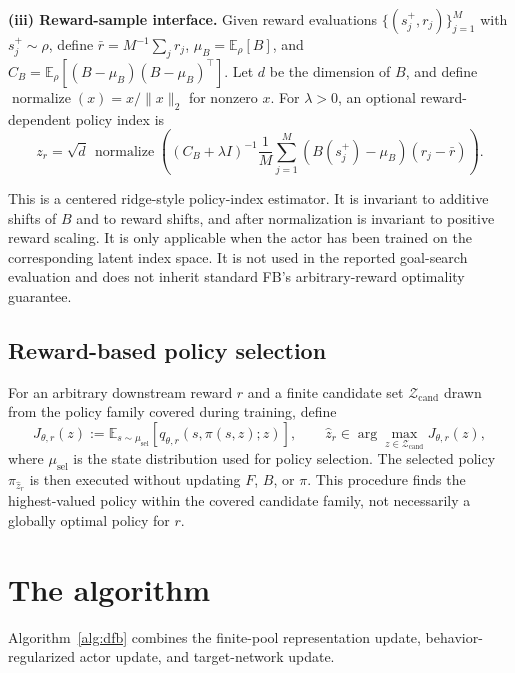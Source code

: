 \documentclass[11pt]{article}
\newcommand{\normalize}{\operatorname{normalize}}
\begin{document}
\textbf{(iii) Reward-sample interface.}
Given reward evaluations $\{(s_j^+,r_j)\}_{j=1}^{M}$ with $s_j^+\sim\rho$, define $\bar r=M^{-1}\sum_jr_j$, $\mu_B=\mathbb E_\rho[B]$, and $C_B=\mathbb E_\rho[(B-\mu_B)(B-\mu_B)^\top]$. Let $d$ be the dimension of $B$, and define $\normalize(x)=x/\lVert x\rVert_2$ for nonzero $x$. For $\lambda>0$, an optional reward-dependent policy index is
\begin{equation}
\boxed{
    z_r = \sqrt d\,\normalize\!\left((C_B+\lambda I)^{-1}\frac1M\sum_{j=1}^{M}(B(s_j^+)-\mu_B)(r_j-\bar r)\right).
}
\label{eq:centered-dual}
\end{equation}

This is a centered ridge-style policy-index estimator. It is invariant to additive shifts of $B$ and to reward shifts, and after normalization is invariant to positive reward scaling. It is only applicable when the actor has been trained on the corresponding latent index space. It is not used in the reported goal-search evaluation and does not inherit standard FB's arbitrary-reward optimality guarantee.

\subsection*{Reward-based policy selection}

For an arbitrary downstream reward $r$ and a finite candidate set $\mathcal Z_{\mathrm{cand}}$ drawn from the policy family covered during training, define
\begin{equation}
    J_{\theta,r}(z) := \mathbb E_{s\sim\mu_{\mathrm{sel}}}\left[q_{\theta,r}(s,\pi(s,z);z)\right], \qquad \hat z_r\in\arg\max_{z\in\mathcal Z_{\mathrm{cand}}}J_{\theta,r}(z),
    \label{eq:policy-search}
\end{equation}
where $\mu_{\mathrm{sel}}$ is the state distribution used for policy selection. The selected policy $\pi_{\hat z_r}$ is then executed without updating $F$, $B$, or $\pi$. This procedure finds the highest-valued policy within the covered candidate family, not necessarily a globally optimal policy for $r$.



\section{The algorithm}


Algorithm~\ref{alg:dfb} combines the finite-pool representation update, behavior-regularized actor update, and target-network update.
\end{document}
